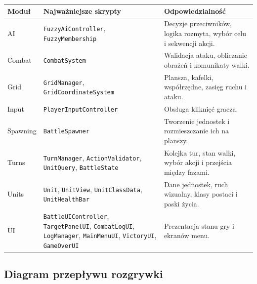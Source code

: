 \documentclass[12pt,a4paper]{article}
\begin{document}
\begin{longtable}{p{4cm} p{5cm} p{6cm}}
\toprule
\textbf{Moduł} & \textbf{Najważniejsze skrypty} & \textbf{Odpowiedzialność} \\
\midrule
\endhead
AI & \texttt{FuzzyAiController}, \texttt{FuzzyMembership} & Decyzje przeciwników, logika rozmyta, wybór celu i sekwencji akcji. \\[4pt]
Combat & \texttt{CombatSystem} & Walidacja ataku, obliczanie obrażeń i komunikaty walki. \\[4pt]
Grid & \texttt{GridManager}, \texttt{GridCoordinateSystem} & Plansza, kafelki, współrzędne, zasięg ruchu i ataku. \\[4pt]
Input & \texttt{PlayerInputController} & Obsługa kliknięć gracza. \\[4pt]
Spawning & \texttt{BattleSpawner} & Tworzenie jednostek i rozmieszczanie ich na planszy. \\[4pt]
Turns & \texttt{TurnManager}, \texttt{ActionValidator}, \texttt{UnitQuery}, \texttt{BattleState} & Kolejka tur, stan walki, wybór akcji i przejścia między fazami. \\[4pt]
Units & \texttt{Unit}, \texttt{UnitView}, \texttt{UnitClassData}, \texttt{UnitHealthBar} & Dane jednostek, ruch wizualny, klasy postaci i paski życia. \\[4pt]
UI & \texttt{BattleUIController}, \texttt{TargetPanelUI}, \texttt{CombatLogUI}, \texttt{LogManager}, \texttt{MainMenuUI}, \texttt{VictoryUI}, \texttt{GameOverUI} & Prezentacja stanu gry i ekranów menu. \\
\bottomrule
\end{longtable}

\subsection{Diagram przepływu rozgrywki}
\end{document}
